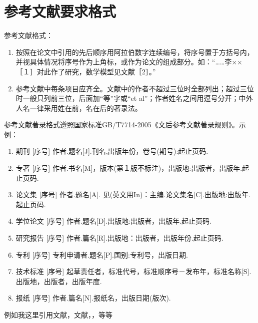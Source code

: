 \chapter{参考文献要求格式}

参考文献格式：
\begin{enumerate}[label=\arabic*.\quad]
    \item 按照在论文中引用的先后顺序用阿拉伯数字连续编号，将序号置于方括号内，并视具体情况将序号作为上角标，或作为论文的组成部分。如：“……李××［１］对此作了研究，数学模型见文献［2］。” 
    \item 参考文献中每条项目应齐全。文献中的作者不超过三位时全部列出；超过三位时一般只列前三位，后面加“等”字或“et al”；作者姓名之间用逗号分开；中外人名一律采用姓在前，名在后的著录法。
\end{enumerate}

参考文献著录格式遵照国家标准GB/T7714-2005《文后参考文献著录规则》。示例：
\begin{enumerate}[label=（\arabic*）]
    \item 期刊
    [序号] 作者.题名[J].刊名,出版年份，卷号(期号):起止页码.
    \item 专著
    [序号] 作者.书名[M]，版本(第１版不标注)，出版地:出版者，出版年.起止页码.
    \item 论文集
    [序号] 作者.题名[A]. 见(英文用In)：主编.论文集名[C].出版地:出版年.起止页码.
    \item 学位论文
    [序号] 作者.题名[D].出版地:出版者，出版年.起止页码.
    \item 研究报告
    [序号] 作者.篇名[R].出版地：出版者，出版年份.起止页码.
    \item 专利
    [序号] 专利申请者.题名[P].国别:专利号，出版日期.
    \item 技术标准
    [序号] 起草责任者，标准代号，标准顺序号－发布年，标准名称[S].出版地，出版者，出版年度.
    \item 报纸
    [序号] 作者.篇名[N].报纸名，出版日期(版次).
\end{enumerate}

例如我这里引用文献\cite{2001Applying}，文献\cite{2004PSO_ZhangLibiao}，\cite{2005Improve_JinYixiong}，\cite{2021A}等等
